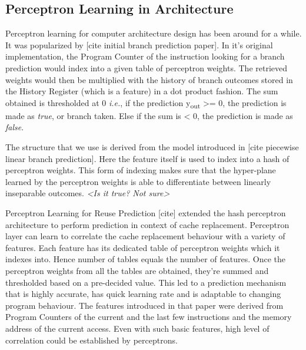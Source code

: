 \documentclass{sig-alternate}
\begin{document}
\subsection{Perceptron Learning in Architecture}

Perceptron learning for computer architecture design has been around for a while. 
It was popularized by [cite initial branch prediction paper]. 
In it's original implementation, the Program Counter of the instruction looking for a branch prediction would index into a given table of perceptron weights. 
The retrieved weights would then be multiplied with the history of branch outcomes stored in the History Register (which is a feature) in a dot product fashion. 
The sum obtained is thresholded at 0 \textit{i.e.}, if the prediction y\textsubscript{out} >= 0, the prediction is made as \textit{true}, or branch taken.
Else if the sum is < 0, the prediction is made as \textit{false}.

The structure that we use is derived from the model introduced in [cite piecewise linear branch prediction]. 
Here the feature itself is used to index into a hash of perceptron weights. 
This form of indexing makes sure that the hyper-plane learned by the perceptron weights is able to differentiate between linearly inseparable outcomes. 
\textit{<Is it true? Not sure>}

Perceptron Learning for Reuse Prediction [cite] extended the hash perceptron architecture to perform prediction in context of cache replacement. 
Perceptron layer can learn to correlate the cache replacement behaviour with a variety of features. 
Each feature has its dedicated table of perceptron weights which it indexes into. 
Hence number of tables equals the number of features. 
Once the perceptron weights from all the tables are obtained, they're summed and thresholded based on a pre-decided value. 
This led to a prediction mechanism that is highly accurate, has quick learning rate and is adaptable to changing program behaviour. 
The features introduced in that paper were derived from Program Counters of the current and the last few instructions and the memory address of the current access. 
Even with such basic features, high level of correlation could be established by perceptrons. 
\end{document}
